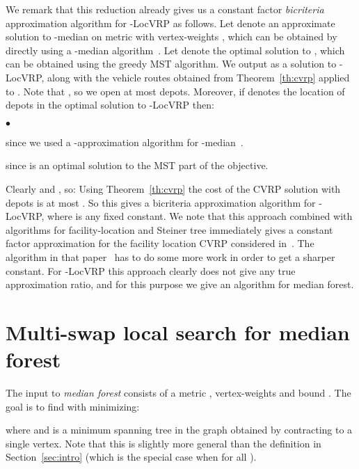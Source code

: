 \documentclass[11pt,twoside,a4paper]{article}
\newcommand{\initOneLiners}{\setlength{\itemsep}{0pt}
    \setlength{\parsep }{0pt}
    \setlength{\topsep }{0pt}
}
\newenvironment{OneLiners}[1][\ensuremath{\bullet}]
    {\begin{list}
        {#1}
        {\initOneLiners}}
    {\end{list}}
\def\lrp{-LocVRP\xspace}
\def\kmf{ median forest\xspace}
\begin{document}
\medskip

We remark that this reduction already gives us a constant factor {\em bicriteria} approximation algorithm for \lrp as
follows. Let  denote an approximate solution to -median on metric  with vertex-weights , which can be obtained by directly using a -median algorithm~\cite{AGKMMP04}. Let  denote the optimal
solution to , which can be obtained using the greedy MST algorithm. We output
 as a solution to \lrp, along with the vehicle routes obtained from
Theorem~\ref{th:cvrp} applied to . Note that , so we open at most  depots. Moreover, if
 denotes the location of depots in the optimal solution to \lrp then:
\begin{OneLiners}
\item  since we used a -approximation algorithm for
-median~\cite{AGKMMP04}.
\item  since   is an optimal solution to the MST part of the objective.
\end{OneLiners}
Clearly  and , so:
 Using Theorem~\ref{th:cvrp} the cost of the CVRP solution
with depots  is at most . So this gives a  bicriteria approximation
algorithm for \lrp, where  is any fixed constant. We note that this approach combined with algorithms for
facility-location and Steiner tree immediately gives a constant factor approximation for the facility location CVRP
considered in~\cite{HKM10}. The algorithm in that paper~\cite{HKM10} has to do  some more work in order to get a
sharper constant. For \lrp this approach clearly does not give any true approximation ratio, and for this purpose we
give an algorithm for \kmf.





\section{Multi-swap local search for \kmf} \label{sec:kmf}
\def\swap{\ensuremath{\mathcal{S}}\xspace}
\def\p{\ensuremath{\mathcal{P}}\xspace}
\def\f{\ensuremath{\mathcal{F}}\xspace}
\def\C{\ensuremath{\mathcal{C}}\xspace}


The input to {\em  median forest} consists of a metric , vertex-weights  and bound . The
goal is to find  with  minimizing:

where  and  is a minimum spanning tree in the graph obtained by contracting 
to a single vertex. Note that this is slightly more general than the definition in Section~\ref{sec:intro} (which is
the special case when  for all ).
\end{document}
